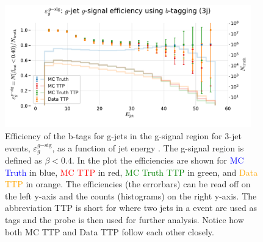 \begin{figure}
  \centerfloat
  \includegraphics[width=0.95\textwidth, trim=0 0 0 40, clip]{figures/quarks/eff_g_gsig-down_sample=1.00-ML_vars=vertex-selection=b-ejet_min=4-n_iter_RS_lgb=99-n_iter_RS_xgb=9-cdot_cut=0.90-version=19.pdf}
  \caption[b-Tagging Efficiency $\varepsilon_g^{g\mathrm{-sig}}$ as a function of jet energy]
          {Efficiency of the b-tags for g-jets in the g-signal region for 3-jet events, $\varepsilon_g^{g\mathrm{-sig}}$, as a function of jet energy . The g-signal region is defined as $\beta < 0.4$. In the plot the efficiencies are shown for \textcolor{blue}{MC Truth} in blue, \textcolor{red}{MC TTP} in red, \textcolor{green}{MC Truth TTP} in green, and \textcolor{orange}{Data TTP} in orange. The efficiencies (the errorbars) can be read off on the left y-axis and the counts (histograms) on the right y-axis. The abbreviation TTP is short for  where two jets in a event are used as tags and the probe is then used for further analysis. Notice how both MC TTP and Data TTP follow each other closely.  
          } 
  \label{fig:q:effiency_btag_gjet_gsig}
\end{figure}

